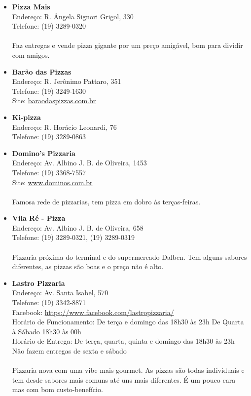 \begin{itemize}
\item \textbf{Pizza Mais}
  \\Endereço: R. Ângela Signori Grigol, 330
  \\Telefone: (19) 3289-0320
  \\
  \\Faz entregas e vende pizza gigante por um preço amigável, bom para dividir
  com amigos.

\item \textbf{Barão das Pizzas}
  \\Endereço: R. Jerônimo Pattaro, 351
  \\Telefone: (19) 3249-1630
  \\Site: \url{baraodaspizzas.com.br}

\item \textbf{Ki-pizza}
  \\Endereço: R. Horácio Leonardi, 76
  \\Telefone: (19) 3289-0863

\item \textbf{Domino's Pizzaria}
  \\Endereço: Av. Albino J. B. de Oliveira, 1453
  \\Telefone: (19) 3368-7557
  \\Site: \url{www.dominos.com.br}
  \\
  \\Famosa rede de pizzarias, tem pizza em dobro às terças-feiras.

\item \textbf{Vila Ré - Pizza}
  \\Endereço: Av. Albino J. B. de Oliveira, 658
  \\Telefone: (19) 3289-0321, (19) 3289-0319
  \\
  \\Pizzaria próxima do terminal e do supermercado Dalben. Tem alguns sabores
  diferentes, as pizzas são boas e o preço não é alto.

\item \textbf{Lastro Pizzaria}
  \\Endereço: Av. Santa Isabel, 570
  \\Telefone: (19) 3342-8871
  \\Facebook: \url{https://www.facebook.com/lastropizzaria/}
  \\Horário de Funcionamento: De terça e domingo das 18h30 às 23h
  De Quarta à Sábado 18h30 às 00h
  \\Horário de Entrega: De terça, quarta, quinta e domingo das 18h30 às 23h
  Não fazem entregas de sexta e sábado
  \\
  \\Pizzaria nova com uma vibe mais gourmet. As pizzas são todas individuais
  e tem desde sabores mais comuns até uns mais diferentes. É um pouco cara
  mas com bom custo-benefício.


\end{itemize}

